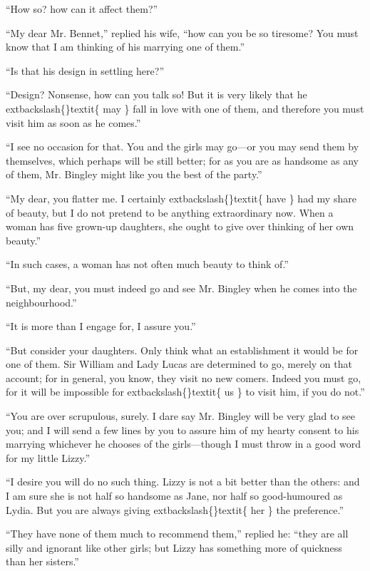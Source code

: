 \documentclass[10pt]{book}
\begin{document}
   “How so? how can it affect them?”
  

   “My dear Mr. Bennet,” replied his wife, “how can you be so tiresome? You
must know that I am thinking of his marrying one of them.”
  

   “Is that his design in settling here?”
  

   “Design? Nonsense, how can you talk so! But it is very likely that he
   	extbackslash\{\}textit\{
    may
   \}
   fall in love with one of them, and therefore you must visit him as
soon as he comes.”
  

   “I see no occasion for that. You and the girls may go—or you may send
them by themselves, which perhaps will be still better; for as you are
as handsome as any of them, Mr. Bingley might like you the best of the
party.”
  

   “My dear, you flatter me. I certainly
   	extbackslash\{\}textit\{
    have
   \}
   had my share of beauty, but
I do not pretend to be anything extraordinary now. When a woman has five
grown-up daughters, she ought to give over thinking of her own beauty.”
  

   “In such cases, a woman has not often much beauty to think of.”
  

   “But, my dear, you must indeed go and see Mr. Bingley when he comes into
the neighbourhood.”
  

   “It is more than I engage for, I assure you.”
  

   “But consider your daughters. Only think what an establishment it would
be for one of them. Sir William and Lady Lucas are determined to go,
merely on that account; for in general, you know, they visit no new
   comers. Indeed you must go, for it will be impossible for
   	extbackslash\{\}textit\{
    us
   \}
   to visit
him, if you do not.”
  

   “You are over scrupulous, surely. I dare say Mr. Bingley will be very
glad to see you; and I will send a few lines by you to assure him of my
hearty consent to his marrying whichever he chooses of the girls—though
I must throw in a good word for my little Lizzy.”
  

   “I desire you will do no such thing. Lizzy is not a bit better than the
others: and I am sure she is not half so handsome as Jane, nor half so
good-humoured as Lydia. But you are always giving
   	extbackslash\{\}textit\{
    her
   \}
   the preference.”
  

   “They have none of them much to recommend them,” replied he: “they are
all silly and ignorant like other girls; but Lizzy has something more of
quickness than her sisters.”
  
\end{document}
